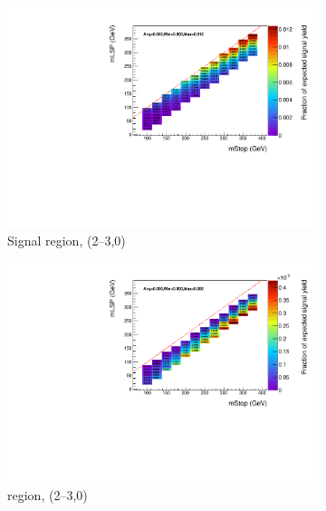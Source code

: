 \begin{figure}[p]
  \centering
  \begin{subfigure}[b]{0.47\textwidth}
    \includegraphics[width=\textwidth]{Figs/sms/t2degen/v23/effs/T2_4body_had_eff_maps_eq0b_le3j_SITV.pdf}
    \caption{Signal region, (2--3,0)}
    \label{fig:t2_4body_sig_eff_le3j_0b}
  \end{subfigure}
  \begin{subfigure}[b]{0.47\textwidth}
    \includegraphics[width=\textwidth]{Figs/sms/t2degen/v23/effs/T2_4body_muon_eff_maps_eq0b_le3j_SITV.pdf}
    \caption{\mj region, (2--3,0)}
    \label{fig:t2_4body_mu_eff_le3j_0b}
  \end{subfigure} \\
  \begin{subfigure}[b]{0.47\textwidth}

\end{subfigure}
\end{figure}
